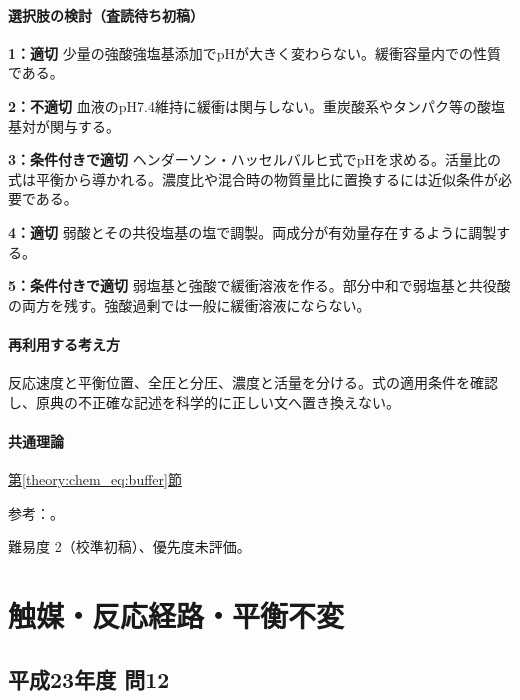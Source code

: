 \paragraph{選択肢の検討（査読待ち初稿）}\mbox{}\par

\noindent\textbf{1：適切} 少量の強酸強塩基添加でpHが大きく変わらない。緩衝容量内での性質である。\par

\noindent\textbf{2：不適切} 血液のpH7.4維持に緩衝は関与しない。重炭酸系やタンパク等の酸塩基対が関与する。\par

\noindent\textbf{3：条件付きで適切} ヘンダーソン・ハッセルバルヒ式でpHを求める。活量比の式は平衡から導かれる。濃度比や混合時の物質量比に置換するには近似条件が必要である。\par

\noindent\textbf{4：適切} 弱酸とその共役塩基の塩で調製。両成分が有効量存在するように調製する。\par

\noindent\textbf{5：条件付きで適切} 弱塩基と強酸で緩衝溶液を作る。部分中和で弱塩基と共役酸の両方を残す。強酸過剰では一般に緩衝溶液にならない。\par

\paragraph{再利用する考え方} 反応速度と平衡位置、全圧と分圧、濃度と活量を分ける。式の適用条件を確認し、原典の不正確な記述を科学的に正しい文へ置き換えない。

\paragraph{共通理論} \hyperref[theory:chem_eq:buffer]{第\ref*{theory:chem_eq:buffer}節}

\par 参考：\cite{iupac_greenbook2012,mit_buffer2008}。

\par 難易度 2（校準初稿）、優先度未評価。

\section{触媒・反応経路・平衡不変}

\subsection{平成23年度 問12}
\label{q:h23-reg-applied-12}

